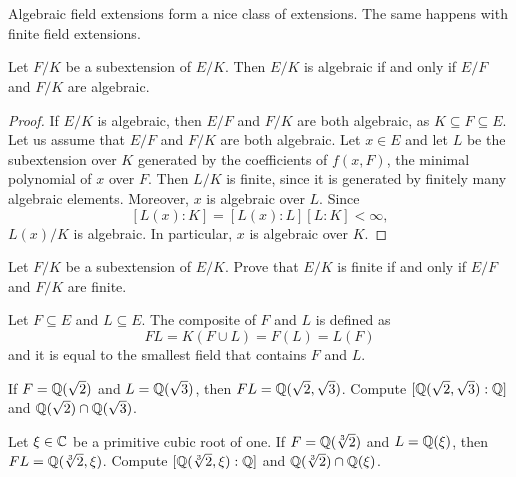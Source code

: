 \chapter{}

%
%
%
Algebraic field extensions form a nice class of extensions. The same happens
with finite field extensions. 

\begin{proposition}
	Let $F/K$ be a subextension of $E/K$. Then $E/K$ is algebraic 
	if and only if $E/F$ and $F/K$ are algebraic. 
\end{proposition}

\begin{proof}
    If $E/K$ is algebraic, then $E/F$ and $F/K$ are both algebraic, 
    as $K\subseteq F\subseteq E$. 
    Let us assume that $E/F$ and $F/K$ are both algebraic. Let $x\in E$ and 
    let $L$ be the subextension over $K$ generated by the coefficients of $f(x,F)$, 
    the minimal polynomial of $x$ over $F$. Then $L/K$ is finite, since it is generated
    by finitely many algebraic elements. Moreover, $x$ is algebraic over $L$. Since 
    \[
    [L(x):K]=[L(x):L][L:K]<\infty,
    \]
    $L(x)/K$ is algebraic. In particular, $x$ is algebraic over $K$. 
\end{proof}

\begin{exercise}
	Let $F/K$ be a subextension of $E/K$. Prove that $E/K$ is finite 
	if and only if $E/F$ and $F/K$ are finite. 
\end{exercise}

Let $F\subseteq E$ and $L\subseteq E$. The composite 
of $F$ and $L$ is defined as 
\[
FL=K(F\cup L)=F(L)=L(F)
\]
and it is equal to the 
smallest field that contains $F$ and $L$. 

\begin{exercise}
    If $F=\mathbb{Q}(\sqrt{2})$ and $L=\mathbb{Q}(\sqrt{3})$, then $FL=\mathbb{Q}(\sqrt{2},\sqrt{3})$. 
    Compute $[\mathbb{Q}(\sqrt{2},\sqrt{3}):\mathbb{Q}]$ and 
    $\mathbb{Q}(\sqrt{2})\cap\mathbb{Q}(\sqrt{3})$. 
\end{exercise}

\begin{exercise}
    Let $\xi\in\mathbb{C}$ be a primitive cubic root of one. 
    If $F=\mathbb{Q}(\sqrt[3]{2})$ and $L=\mathbb{Q}(\xi)$, then $FL=\mathbb{Q}(\sqrt[3]{2},\xi)$. 
    Compute $[\mathbb{Q}(\sqrt[3]{2},\xi):\mathbb{Q}]$ and 
    $\mathbb{Q}(\sqrt[3]{2})\cap\mathbb{Q}(\xi)$. 
\end{exercise}

